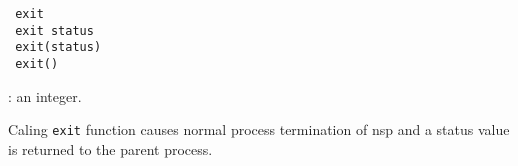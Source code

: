 \begin{mandesc}
\end{mandesc}

\begin{calling_sequence}
\begin{verbatim}
 exit 
 exit status
 exit(status)
 exit()
\end{verbatim}
\end{calling_sequence}
\begin{parameters}
  \begin{varlist}
    : an integer.
  \end{varlist}
\end{parameters}
\label{exit}
\begin{mandescription}
  Caling \verb+exit+ function causes normal process termination of 
  nsp and a status value is returned to the parent process.
\end{mandescription}
\begin{manseealso}
    
\end{manseealso}
